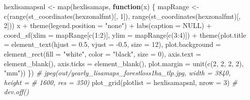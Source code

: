 \documentclass[10pt,landscape,a3paper]{article}
\newenvironment{Shaded}{\begin{snugshade}}{\end{snugshade}}
\newcommand{\AttributeTok}[1]{\textcolor[rgb]{0.77,0.63,0.00}{#1}}
\newcommand{\CommentTok}[1]{\textcolor[rgb]{0.56,0.35,0.01}{\textit{#1}}}
\newcommand{\ConstantTok}[1]{\textcolor[rgb]{0.00,0.00,0.00}{#1}}
\newcommand{\ControlFlowTok}[1]{\textcolor[rgb]{0.13,0.29,0.53}{\textbf{#1}}}
\newcommand{\DecValTok}[1]{\textcolor[rgb]{0.00,0.00,0.81}{#1}}
\newcommand{\FloatTok}[1]{\textcolor[rgb]{0.00,0.00,0.81}{#1}}
\newcommand{\FunctionTok}[1]{\textcolor[rgb]{0.00,0.00,0.00}{#1}}
\newcommand{\NormalTok}[1]{#1}
\newcommand{\OtherTok}[1]{\textcolor[rgb]{0.56,0.35,0.01}{#1}}
\newcommand{\SpecialCharTok}[1]{\textcolor[rgb]{0.00,0.00,0.00}{#1}}
\newcommand{\StringTok}[1]{\textcolor[rgb]{0.31,0.60,0.02}{#1}}
\begin{document}
\begin{Shaded}
\begin{Highlighting}[]
\NormalTok{hexlisamapsnl }\OtherTok{\textless{}{-}} \FunctionTok{map}\NormalTok{(hexlisamaps, }\ControlFlowTok{function}\NormalTok{(x) \{}
\NormalTok{    mapRange }\OtherTok{\textless{}{-}} \FunctionTok{c}\NormalTok{(}\FunctionTok{range}\NormalTok{(}\FunctionTok{st\_coordinates}\NormalTok{(hexzonalfmt)[, }\DecValTok{1}\NormalTok{]), }\FunctionTok{range}\NormalTok{(}\FunctionTok{st\_coordinates}\NormalTok{(hexzonalfmt)[,}
        \DecValTok{2}\NormalTok{]))}
\NormalTok{    x }\SpecialCharTok{+} \FunctionTok{theme}\NormalTok{(}\AttributeTok{legend.position =} \StringTok{"none"}\NormalTok{) }\SpecialCharTok{+} \FunctionTok{labs}\NormalTok{(}\AttributeTok{caption =} \ConstantTok{NULL}\NormalTok{) }\SpecialCharTok{+} \FunctionTok{coord\_sf}\NormalTok{(}\AttributeTok{xlim =}\NormalTok{ mapRange[}\FunctionTok{c}\NormalTok{(}\DecValTok{1}\SpecialCharTok{:}\DecValTok{2}\NormalTok{)],}
        \AttributeTok{ylim =}\NormalTok{ mapRange[}\FunctionTok{c}\NormalTok{(}\DecValTok{3}\SpecialCharTok{:}\DecValTok{4}\NormalTok{)]) }\SpecialCharTok{+} \FunctionTok{theme}\NormalTok{(}\AttributeTok{plot.title =} \FunctionTok{element\_text}\NormalTok{(}\AttributeTok{hjust =} \FloatTok{0.5}\NormalTok{, }\AttributeTok{vjust =} \SpecialCharTok{{-}}\FloatTok{0.5}\NormalTok{,}
        \AttributeTok{size =} \DecValTok{12}\NormalTok{), }\AttributeTok{plot.background =} \FunctionTok{element\_rect}\NormalTok{(}\AttributeTok{fill =} \StringTok{"white"}\NormalTok{, }\AttributeTok{color =} \StringTok{"black"}\NormalTok{,}
        \AttributeTok{size =} \DecValTok{0}\NormalTok{), }\AttributeTok{axis.text =} \FunctionTok{element\_blank}\NormalTok{(), }\AttributeTok{axis.ticks =} \FunctionTok{element\_blank}\NormalTok{(), }\AttributeTok{plot.margin =} \FunctionTok{unit}\NormalTok{(}\FunctionTok{c}\NormalTok{(}\DecValTok{2}\NormalTok{,}
        \DecValTok{2}\NormalTok{, }\DecValTok{2}\NormalTok{, }\DecValTok{2}\NormalTok{), }\StringTok{"mm"}\NormalTok{))}
\NormalTok{\})}
\CommentTok{\# jpeg(\textquotesingle{}out/yearly\_lisamaps\_forestloss1ha\_tlp.jpg\textquotesingle{}, width = 3840, height =}
\CommentTok{\# 1600, res = 350)}
\FunctionTok{plot\_grid}\NormalTok{(}\AttributeTok{plotlist =}\NormalTok{ hexlisamapsnl, }\AttributeTok{nrow =} \DecValTok{3}\NormalTok{)}
\CommentTok{\# dev.off()}


\end{Highlighting}
\end{Shaded}
\end{document}

